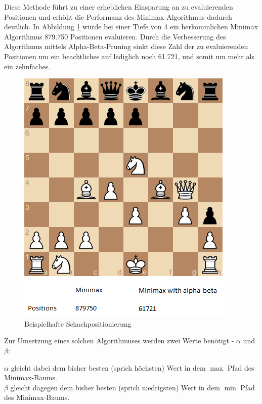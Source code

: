 Diese Methode führt zu einer erheblichen Einsparung an zu evaluierenden Positionen und erhöht die Performanz des Minimax Algorithmus dadurch deutlich. In Abbildung \ref{fig:chess_example} würde bei einer Tiefe von 4 ein herkömmlichen Minimax Algorithmus 879.750 Positionen evaluieren. Durch die Verbesserung des Algorithmus mittels Alpha-Beta-Pruning sinkt diese Zahl der zu evaluierenden Positionen um ein beachtliches auf lediglich noch 61.721, und somit um mehr als ein zehnfaches. \cite{Hartikka}

\begin{figure}[h]
\centering
\includegraphics[width=\textwidth/2]{images/alpha-beta-example.png}

\caption{Beispielhafte Schachpositionierung \cite{Hartikka}}\label{fig:chess_example}
\end{figure}

Zur Umsetzung eines solchen Algorithmuses werden zwei Werte benötigt - $\alpha$ und $\beta$:

$\alpha$ gleicht dabei dem bisher besten (sprich höchsten) Wert in dem $\max$ Pfad des Minimax-Baums.\\
$\beta$ gleicht dagegen dem bisher besten (sprich niedrigsten) Wert in dem $\min$ Pfad des Minimax-Baums. \cite{Russell2010}

